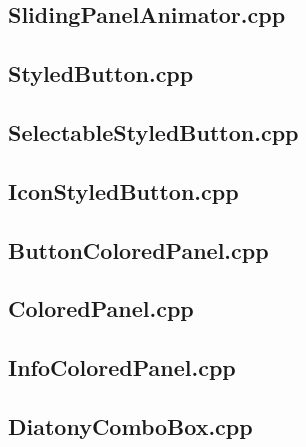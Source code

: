 \subsection{SlidingPanelAnimator.cpp}


\subsection{StyledButton.cpp}


\subsection{SelectableStyledButton.cpp}


\subsection{IconStyledButton.cpp}


\subsection{ButtonColoredPanel.cpp}


\subsection{ColoredPanel.cpp}


\subsection{InfoColoredPanel.cpp}


\subsection{DiatonyComboBox.cpp}


